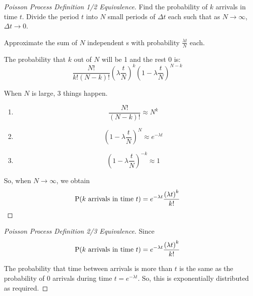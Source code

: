 \begin{proof}[Poisson Process Definition 1/2 Equivalence]\label{proof:Poisson_Process_Defn_1-2}
  Find the probability of $k$ arrivals in time $t$.
  Divide the period $t$ into $N$ small periods of $\Delta t$ each such that as $N \rightarrow \infty$, $\Delta t \rightarrow 0$.

  Approximate the sum of $N$ independent s with probability $\frac{\lambda t}{N}$ each.

  The probability that $k$ out of $N$ will be 1 and the rest 0 is:
  \begin{equation*}
    \frac{N!}{k! (N-k)!} {\left( \lambda \frac{t}{N} \right)}^{k} {\left( 1 - \lambda \frac{t}{N} \right)}^{N-k}
  \end{equation*}

  When $N$ is large, 3 things happen.
  \begin{enumerate}[noitemsep]
  \item \begin{equation}
      \frac{N!}{(N-k)!} \approx N^{k}
    \end{equation}
  \item \begin{equation}
      {\left( 1 - \lambda \frac{t}{N} \right)}^{N} \approx e^{-\lambda t}
    \end{equation}
  \item \begin{equation}
      {\left( 1 - \lambda \frac{t}{N} \right)}^{-k} \approx 1
    \end{equation}
\end{enumerate}

  So, when $N \rightarrow \infty$, we obtain
  \begin{equation*}
    \operatorname{\operatorname{P}}(k \text{ arrivals in time } t) = e^{-\lambda t} \frac{{(\lambda t)}^{k}}{k!}
  \end{equation*}
\end{proof}

\begin{proof}[Poisson Process Definition 2/3 Equivalence]\label{proof:Poisson_Process_Defn_2-3}
  Since
  \begin{equation*}
    \operatorname{\operatorname{P}}(k \text{ arrivals in time } t) = e^{-\lambda t} \frac{{(\lambda t)}^{k}}{k!}
  \end{equation*}

  The probability that time between arrivals is more than $t$ is the same as the probability of 0 arrivals during time $t = e^{-\lambda t}$.
  So, this is exponentially distributed as required.
\end{proof}

